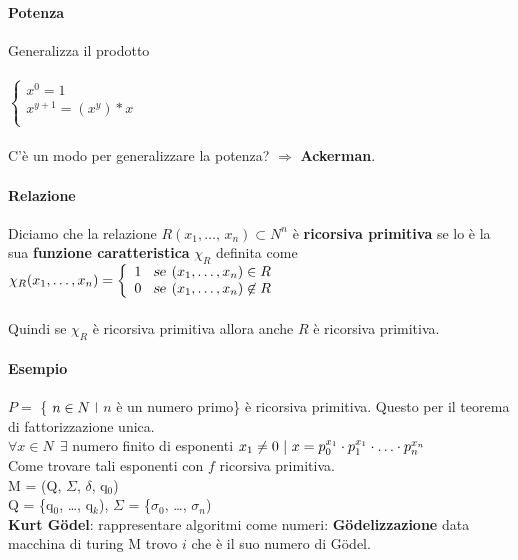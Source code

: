 \documentclass[10pt]{book}
\begin{document}
\begin{multicols}{2}
\paragraph{Potenza}
Generalizza il prodotto\\\\
\begin{math}
		\left\{
		\begin{array}{l}
			x^0 = 1\\
			x^{y + 1} = (x^y) * x\\
		\end{array}
		\right.
\end{math}\\\\
C'è un modo per generalizzare la potenza? $\Rightarrow$ \textbf{Ackerman}.
\end{multicols}

\paragraph{Relazione} Diciamo che la relazione $R(x_1,\ldots,\,x_n) \subset N^n$ è \textbf{ricorsiva primitiva} se lo è la sua \textbf{funzione caratteristica} $\chi_R$ definita come\\
\begin{math}
\chi_R(x_1,\ldots, x_n) = 
		\left\{
		\begin{array}{l}
			1 \:\:\:\:\textsl{se}\:\: (x_1, \ldots, x_n) \in R\\
			0 \:\:\:\:\textsl{se}\:\: (x_1, \ldots, x_n) \not\in R
		\end{array}
		\right.
\end{math}\\\\
Quindi se $\chi_R$ è ricorsiva primitiva allora anche $R$ è ricorsiva primitiva.

\paragraph{Esempio} $P =$ \{ $n \in N\:\:\vline$ $n$ è un numero primo\} è ricorsiva primitiva. Questo per il teorema di fattorizzazione unica.\\
$\forall x \in N\:\:\exists$ numero finito di esponenti $x_1 \neq 0\:\:\vline\:\: x = p_0^{x_1}\cdot p_1^{x_1}\cdot\ldots\cdot p_n^{x_n}$\\
Come trovare tali esponenti con $f$ ricorsiva primitiva.\\
M = (Q, $\Sigma$, $\delta$, q$_0$)\\
Q = \{q$_0$, \ldots, q$_k$), $\Sigma$ = \{$\sigma_0$, \ldots, $\sigma_n$)\\
\textbf{Kurt G\"{o}del}: rappresentare algoritmi come numeri: \textbf{G\"{o}delizzazione} data macchina di turing M trovo $i$ che è il suo numero di G\"{o}del.
\end{document}
